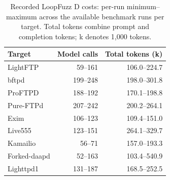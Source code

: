 \begin{table}[!tbp]
\centering\small
\caption{Recorded LoopFuzz D costs: per-run minimum--maximum across the available benchmark runs per target. Total tokens combine prompt and completion tokens; k denotes 1,000 tokens.}
\label{tab:observed_costs}
\begin{tabular}{lrr}
\toprule
Target & Model calls & Total tokens (k) \\
\midrule
LightFTP & 59--161 & 106.0--224.7 \\
bftpd & 199--248 & 198.0--301.8 \\
ProFTPD & 188--192 & 170.1--198.8 \\
Pure-FTPd & 207--242 & 200.2--264.1 \\
Exim & 106--123 & 109.4--151.0 \\
Live555 & 123--151 & 264.1--329.7 \\
Kamailio & 56--71 & 157.0--193.3 \\
Forked-daapd & 52--163 & 103.4--540.9 \\
Lighttpd1 & 131--187 & 168.5--252.5 \\
\bottomrule
\end{tabular}
\end{table}
